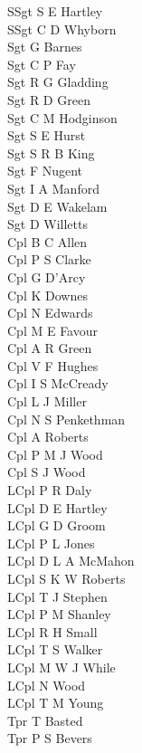\begin{multicols}{4}
  \scriptsize
  \noindent
  SSgt S E Hartley \\
  SSgt C D Whyborn \\
  Sgt G Barnes \\
  Sgt C P Fay \\
  Sgt R G Gladding \\
  Sgt R D Green \\
  Sgt C M Hodginson \\
  Sgt S E Hurst \\
  Sgt S R B King \\
  Sgt F Nugent \\
  Sgt I A Manford \\
  Sgt D E Wakelam \\
  Sgt D Willetts \\
  Cpl B C Allen \\
  Cpl P S Clarke \\
  Cpl G D'Arcy \\
  Cpl K Downes \\
  Cpl N Edwards \\
  Cpl M E Favour \\
  Cpl A R Green \\
  Cpl V F Hughes \\
  Cpl I S McCready \\
  Cpl L J Miller \\
  Cpl N S Penkethman \\
  Cpl A Roberts \\
  Cpl P M J Wood \\
  Cpl S J Wood \\
  LCpl P R Daly \\
  LCpl D E Hartley \\
  LCpl G D Groom \\
  LCpl P L Jones \\
  LCpl D L A McMahon \\
  LCpl S K W Roberts \\
  LCpl T J Stephen \\
  LCpl P M Shanley \\
  LCpl R H Small \\
  LCpl T S Walker \\
  LCpl M W J While \\
  LCpl N Wood \\
  LCpl T M Young \\
  Tpr T Basted \\
  Tpr P S Bevers \\

\end{multicols}
